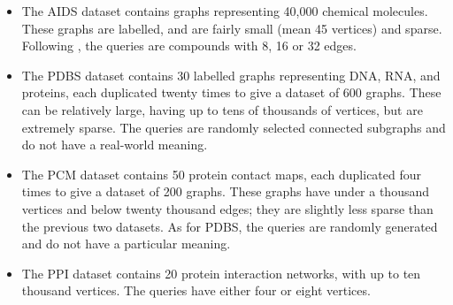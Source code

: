 \documentclass[twoside,11pt]{article}
\newcommand{\citep}[1]{\cite{#1}}
\begin{document}
\begin{itemize}
    \item The AIDS dataset contains graphs representing 40,000 chemical molecules. These graphs are
        labelled, and are fairly small (mean 45 vertices) and sparse. Following
        \citeauthor{o:10.1371/journal.pone.0076911}, the queries are compounds with 8, 16 or 32
        edges.
    \item The PDBS dataset \citep{o:HeLCBBSKMR02} contains 30 labelled graphs representing DNA, RNA,
        and proteins, each duplicated twenty times to give a dataset of 600 graphs. These
        can be relatively large, having up to tens of thousands of vertices, but are extremely
        sparse. The queries are randomly selected connected subgraphs and do not have a real-world
        meaning.
    \item The PCM dataset \citep{o:doi:10.1093/bioinformatics/btr163} contains 50 protein contact
        maps, each duplicated four times to give a dataset of 200 graphs. These graphs have under a
        thousand vertices and below twenty thousand edges; they are slightly less sparse than the
        previous two datasets. As for PDBS, the queries are randomly generated and do not have a
        particular meaning.
    \item The PPI dataset contains 20 protein interaction networks, with up to ten thousand
        vertices. The queries have either four or eight vertices.
\end{itemize}
\end{document}
